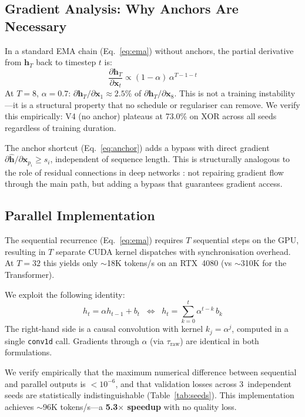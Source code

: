 \documentclass[11pt,a4paper]{article}
\begin{document}
\subsection{Gradient Analysis: Why Anchors Are Necessary}
\label{sec:gradient}

In a standard EMA chain (Eq.~\ref{eq:ema}) without anchors, the partial
derivative from $\mathbf{h}_T$ back to timestep $t$ is:
\begin{equation}
  \frac{\partial\mathbf{h}_T}{\partial\mathbf{x}_t}
  \propto (1-\alpha)\,\alpha^{T-1-t}
  \label{eq:grad}
\end{equation}
At $T=8$, $\alpha=0.7$: $\partial\mathbf{h}_T/\partial\mathbf{x}_1
\approx 2.5\%$ of $\partial\mathbf{h}_T/\partial\mathbf{x}_8$.
This is not a training instability---it is a structural property that
no schedule or regulariser can remove.
We verify this empirically: V4 (no anchor) plateaus at 73.0\% on XOR
across all seeds regardless of training duration.

The anchor shortcut (Eq.~\ref{eq:anchor}) adds a bypass with direct
gradient $\partial\hat{\mathbf{h}}/\partial\mathbf{x}_{p_i} \geq s_i$,
independent of sequence length.
This is structurally analogous to the role of residual connections
in deep networks \citep{he2016deep}: not repairing gradient flow through
the main path, but adding a bypass that guarantees gradient access.

\subsection{Parallel Implementation}
\label{sec:parallel}

The sequential recurrence (Eq.~\ref{eq:ema}) requires $T$ sequential
steps on the GPU, resulting in $T$ separate CUDA kernel dispatches
with synchronisation overhead. At $T=32$ this yields only $\sim$18K
tokens/s on an RTX~4080 (vs $\sim$310K for the Transformer).

We exploit the following identity:
\begin{equation}
  h_t = \alpha h_{t-1} + b_t
  \;\;\Longleftrightarrow\;\;
  h_t = \sum_{k=0}^{t}\alpha^{t-k}\,b_k
  \label{eq:conv_id}
\end{equation}
The right-hand side is a causal convolution with kernel
$k_j = \alpha^j$, computed in a single \texttt{conv1d} call.
Gradients through $\alpha$ (via $\tau_\mathrm{raw}$) are identical
in both formulations.

We verify empirically that the maximum numerical difference between
sequential and parallel outputs is $< 10^{-6}$, and that
validation losses across 3~independent seeds are statistically
indistinguishable (Table~\ref{tab:seeds}).
This implementation achieves $\sim$96K tokens/s---a
\textbf{5.3$\times$ speedup} with no quality loss.
\end{document}
